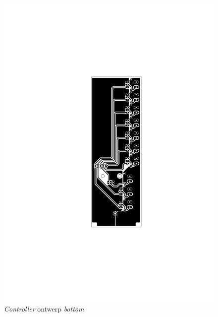 \begin{figure}
    \includegraphics[scale=0.75]{figures/controller_bottom.pdf}
    \caption{\emph{Controller} ontwerp \emph{bottom}}
\end{figure}

